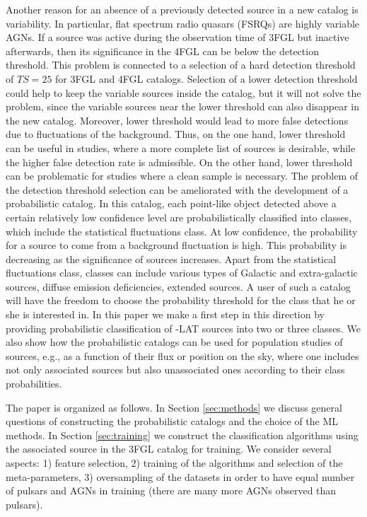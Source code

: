 Another reason for an absence of a previously detected source in a new catalog is variability.
In particular, flat spectrum radio quasars (FSRQs) are highly variable AGNs.
If a source was active during the observation time of 3FGL but inactive afterwards, 
then its significance in the 4FGL can be below the detection threshold.
This problem is connected to a selection of a hard detection threshold of $TS = 25$ for 3FGL and 4FGL catalogs.
Selection of a lower detection threshold could help to keep the variable sources inside the catalog, 
but it will not solve the problem, since the variable sources near the lower threshold can also disappear in the new catalog.
Moreover, lower threshold would lead to more false detections due to fluctuations of the background.
Thus, on the one hand, lower threshold can be useful in studies, where a more complete list of sources is desirable,
while the higher false detection rate is admissible. On the other hand, lower threshold can be problematic for studies where 
a clean sample is necessary. 
The problem of the detection threshold selection can be ameliorated with the development of a probabilistic catalog.
In this catalog, each point-like object detected above a certain relatively low confidence level
are probabilistically classified into classes, which include the statistical fluctuations class.
At low confidence, the probability for a source to come from a background fluctuation is high.
This probability is decreasing as the significance of sources increases.
Apart from the statistical fluctuations class, classes can include various types of Galactic and extra-galactic sources, diffuse emission deficiencies, extended sources.
A user of such a catalog will have the freedom to choose the probability threshold for the class that he or she is interested in.
In this paper we make a first step in this direction by providing probabilistic classification of \Fermi-LAT sources into two or three classes.
We also show how the probabilistic catalogs can be used for population studies of sources, e.g., as a function of their flux or position on the sky, where one includes not only associated sources but also unassociated ones according to their class probabilities.

The paper is organized as follows.
In Section \ref{sec:methods} we discuss general questions of constructing the probabilistic catalogs and the choice of the ML methods.
In Section \ref{sec:training} we construct the classification algorithms using the associated source in the 3FGL catalog for training. We consider several aspects: 1) feature selection, 2) training of the algorithms and selection of the meta-parameters,
3) oversampling of the datasets in order to have equal number of pulsars and AGNs in training (there are many more AGNs observed than pulsars).

